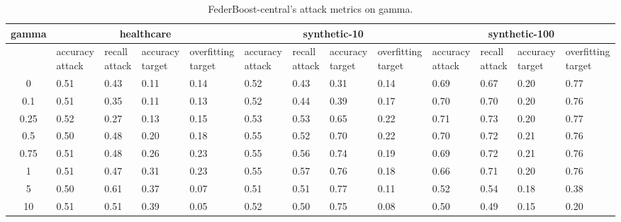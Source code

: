 \begin{table*}[]\centering
\begin{tabular}{|c| *{12}{m{1.0cm}|}}
\hline\rowcolor{gray!50}
\cellcolor{gray!80} gamma & \multicolumn{4}{c|}{healthcare} & \multicolumn{4}{c|}{synthetic-10} & \multicolumn{4}{c|}{synthetic-100}\\\hline 
& accuracy attack & recall attack & accuracy target & overfitting target & accuracy attack & recall attack & accuracy target & overfitting target & accuracy attack & recall attack & accuracy target & overfitting target\\\hline
0 & 0.51 & 0.43 & 0.11 & 0.14 & 0.52 & 0.43 & 0.31 & 0.14 & 0.69 & 0.67 & 0.20 & 0.77\\ \hline
0.1 & 0.51 & 0.35 & 0.11 & 0.13 & 0.52 & 0.44 & 0.39 & 0.17 & 0.70 & 0.70 & 0.20 & 0.76\\ \hline
0.25 & 0.52 & 0.27 & 0.13 & 0.15 & 0.53 & 0.53 & 0.65 & 0.22 & 0.71 & 0.73 & 0.20 & 0.77\\ \hline
0.5 & 0.50 & 0.48 & 0.20 & 0.18 & 0.55 & 0.52 & 0.70 & 0.22 & 0.70 & 0.72 & 0.21 & 0.76\\ \hline
0.75 & 0.51 & 0.48 & 0.26 & 0.23 & 0.55 & 0.56 & 0.74 & 0.19 & 0.69 & 0.72 & 0.21 & 0.76\\ \hline
1 & 0.51 & 0.47 & 0.31 & 0.23 & 0.55 & 0.57 & 0.76 & 0.18 & 0.66 & 0.71 & 0.20 & 0.76\\ \hline
5 & 0.50 & 0.61 & 0.37 & 0.07 & 0.51 & 0.51 & 0.77 & 0.11 & 0.52 & 0.54 & 0.18 & 0.38\\ \hline
10 & 0.51 & 0.51 & 0.39 & 0.05 & 0.52 & 0.50 & 0.75 & 0.08 & 0.50 & 0.49 & 0.15 & 0.20\\ \hline
\end{tabular} 
\caption{FederBoost-central's attack metrics on gamma.}
\label{tab:experiment1_gamma}
\end{table*}
